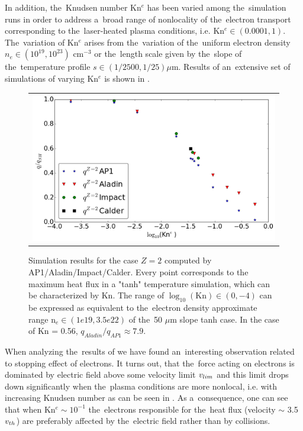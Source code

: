 In addition, the~Knudsen number Kn$^e$ has been varied among the~simulation 
runs in order to address a~broad range of nonlocality of 
the~electron transport corresponding 
to the~laser-heated plasma conditions, i.e. Kn$^e \in (0.0001, 1)$. 
The~variation of Kn$^e$ arises from the~variation
of the~uniform electron density $n_e \in (10^{19}, 10^{23})$ cm$^{-3}$ or 
the~length scale given by the~slope of the~temperature profile 
$s \in (1/2500, 1/25) \mu$m. Results of an~extensive set of simulations of
varying Kn$^e$ is shown in .
 
\begin{figure}[tbh]
  \begin{center}
    \begin{tabular}{c}
      \includegraphics[width=\figscale\textwidth]{Kn_results.png}
    \end{tabular}
  \caption{  
  Simulation results for the case $Z=2$ computed by AP1/Aladin/Impact/Calder.
  Every point corresponds to the maximum heat flux in a "tanh" temperature 
  simulation, which can be characterized by Kn. The range of 
  $\log_{10}(\text{Kn})\in (0, -4)$ can be expressed as equivalent 
  to the~electron density approximate range n$_e \in (1e19, 3.5e22)$ of 
  the~50 $\mu$m slope tanh case. In the case of Kn = 0.56, 
  $q_{Aladin} / q_{AP1}\approx 7.9$.}
  \label{fig:Kn_results}
  \end{center} 
\end{figure}
When analyzing the~results of  we have found 
an~interesting observation related to stopping effect of electrons.
It turns out, that the~force acting on electrons is dominated by electric field
above some velocity limit $v_{lim}$ and this limit drops down significantly
when the~plasma conditions are more nonlocal, i.e. with increasing Knudsen 
number as can be seen in . As a~consequence, one can see
that when Kn$^{e} \sim 10^{-1}$ the~electrons responsible for the~heat flux
(velocity $\sim$ 3.5 $v_{th}$) are preferably affected by the~electric field
rather than by collisions.


